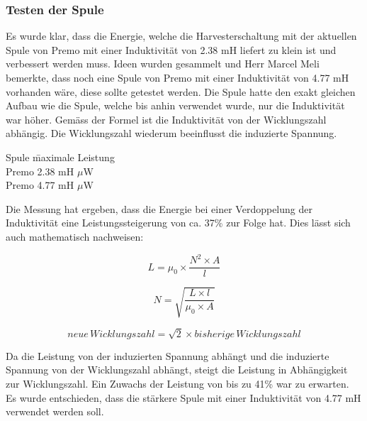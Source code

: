 \subsubsection{Testen der Spule}\label{starkeSpule}

Es wurde klar, dass die Energie, welche die Harvesterschaltung mit der aktuellen Spule von Premo mit einer Induktivität von 2.38 mH liefert zu klein ist und verbessert werden muss. Ideen wurden gesammelt und Herr Marcel Meli bemerkte, dass noch eine Spule von Premo mit einer Induktivität von 4.77 mH vorhanden wäre, diese sollte getestet werden. Die Spule hatte den exakt gleichen Aufbau wie die Spule, welche bis anhin verwendet wurde, nur die Induktivität war höher. Gemäss der Formel \cite{equ_inductivity} ist die Induktivität von der Wicklungszahl abhängig. Die Wicklungszahl wiederum beeinflusst die induzierte Spannung.

\begin{tabbing}
    Spule\hspace{2cm}   \quad\= maximale Leistung    \\[0.8ex]
    Premo 2.38 mH         $\mu$W\\
	Premo 4.77 mH         $\mu$W\\
	
\end{tabbing}

Die Messung hat ergeben, dass die Energie bei einer Verdoppelung der Induktivität eine Leistungssteigerung von ca. 37\thinspace\% zur Folge hat. Dies lässt sich auch mathematisch nachweisen:

\begin{equation}
	L = \mu_0 \times \frac{N^2\times A}{l}
\end{equation}

\begin{equation}
	N = \sqrt{\frac{L\times l}{\mu_0\times A}}
\end{equation}

\begin{equation}
	neue\,Wicklungszahl = \sqrt{2} \times bisherige\,Wicklungszahl
\end{equation}

Da die Leistung von der induzierten Spannung abhängt und die induzierte Spannung von der Wicklungszahl abhängt, steigt die Leistung in Abhängigkeit zur Wicklungszahl. Ein Zuwachs der Leistung von bis zu 41\thinspace\% war zu erwarten. Es wurde entschieden, dass die stärkere Spule mit einer Induktivität von 4.77 mH verwendet werden soll.

